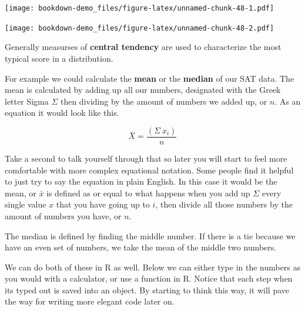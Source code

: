 \documentclass[]{book}
\newenvironment{Shaded}{\begin{snugshade}}{\end{snugshade}}
\newcommand{\KeywordTok}[1]{\textcolor[rgb]{0.13,0.29,0.53}{\textbf{#1}}}
\newcommand{\DataTypeTok}[1]{\textcolor[rgb]{0.13,0.29,0.53}{#1}}
\newcommand{\DecValTok}[1]{\textcolor[rgb]{0.00,0.00,0.81}{#1}}
\newcommand{\StringTok}[1]{\textcolor[rgb]{0.31,0.60,0.02}{#1}}
\newcommand{\OperatorTok}[1]{\textcolor[rgb]{0.81,0.36,0.00}{\textbf{#1}}}
\newcommand{\NormalTok}[1]{#1}
\theoremstyle{definition}
\theoremstyle{definition}
\theoremstyle{definition}
\theoremstyle{remark}
\begin{document}
\texttt{[image: bookdown-demo\_files/figure-latex/unnamed-chunk-48-1.pdf]}

\begin{Shaded}
\end{Shaded}

\texttt{[image: bookdown-demo\_files/figure-latex/unnamed-chunk-48-2.pdf]}

Generally measurses of \textbf{central tendency} are used to
characterize the most typical score in a distribution.

For example we could calculate the \textbf{mean} or the \textbf{median}
of our SAT data. The mean is calculated by adding up all our numbers,
designated with the Greek letter Sigma \(\Sigma\) then dividing by the
amount of numbers we added up, or \(n\). As an equation it would look
like this.

\[\bar{X} = \frac{(\Sigma\ x_i)}{n}\]

Take a second to talk yourself through that so later you will start to
feel more comfortable with more complex equational notation. Some people
find it helpful to just try to say the equation in plain English. In
this case it would be the mean, or \(\bar{x}\) is defined as or equal to
what happens when you add up \(\Sigma\) every single value \(x\) that
you have going up to \(i\), then divide all those numbers by the amount
of numbers you have, or \(n\).

The median is defined by finding the middle number. If there is a tie
because we have an even set of numbers, we take the mean of the middle
two numbers.

We can do both of these in R as well. Below we can either type in the
numbers as you would with a calculator, or use a function in R. Notice
that each step when its typed out is saved into an object. By starting
to think this way, it will pave the way for writing more elegant code
later on.
\end{document}
